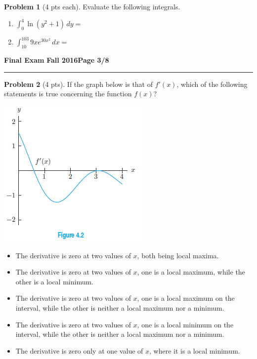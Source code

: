 \documentclass[12pt]{article}
\makeatletter
\theoremstyle{definition}
\newtheorem{problem}{Problem}
\newcommand*{\radiobutton}{%
  \@ifstar{\@radiobutton0}{\@radiobutton1}%
}
\newcommand*{\@radiobutton}[1]{%
  \begin{tikzpicture}
    \pgfmathsetlengthmacro\radius{height("X")/2}
    \draw[radius=\radius] circle;
    \ifcase#1 \fill[radius=.6*\radius] circle;\fi
  \end{tikzpicture}%
}
\makeatother
\begin{document}
\begin{problem}[4 pts each]
Evaluate the following integrals.
\begin{enumerate}
\item $\displaystyle{\int_{0}^{4} \ln(y^2 + 1) \, dy} = $
\item $\displaystyle{\int_{10}^{103} 9xe^{30x^2}\, dx = }$
\vspace{7cm}
\end{enumerate}
\end{problem}

\newpage

\hfill{\large\bf Final Exam}\hfill{\large\bf
  Fall 2016}\hfill{\large\bf Page 3/8}\hrule

\bigskip

\begin{problem}[4 pts]
If the graph below is that of $f'(x)$, which of the following statements is true concerning the function $f(x)$?
\begin{multicols}{2}
\includegraphics{3graph2}
\vspace{2cm}

\begin{itemize}
\item[\radiobutton] The derivative is zero at two values of $x$, both being local maxima.
\item[\radiobutton] The derivative is zero at two values of $x$, one is a local maximum, while the other is a local minimum.
\item[\radiobutton] The derivative is zero at two values of $x$, one is a local maximum on the interval, while the other is neither a local maximum nor a minimum.
\item[\radiobutton] The derivative is zero at two values of $x$, one is a local minimum on the interval, while the other is neither a local maximum nor a minimum.
\item[\radiobutton] The derivative is zero only at one value of $x$, where it is a local minimum.
\end{itemize}
\end{multicols}
\end{problem}
\end{document}
